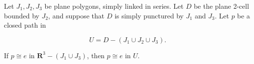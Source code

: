 Let $J_1, J_2, J_3$ be plane polygons, simply linked in series. Let $D$ be the plane 2-cell bounded by $J_2$, and suppose that $D$ is simply punctured by $J_1$ and $J_3$. Let $p$ be a closed path in

$$U = D - (J_1 \cup J_2 \cup J_3).$$

If $p \cong e$ in $\mathbf{R}^3 - (J_1 \cup J_3)$, then $p \cong e$ in $U$.
